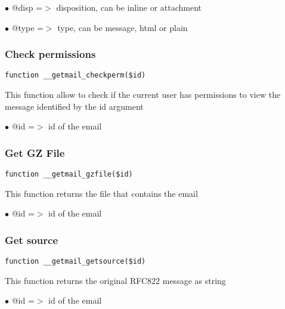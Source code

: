 \documentclass[a4paper]{article}
\begin{document}
\begin{compactitem}
\item[\color{myblue}$\bullet$] @disp =$>$ disposition, can be inline or attachment
\item[\color{myblue}$\bullet$] @type =$>$ type, can be message, html or plain
\end{compactitem}

\hypertarget{toc89}{}
\subsubsection{Check permissions}

\begin{lstlisting}
function __getmail_checkperm($id)
\end{lstlisting}

This function allow to check if the current user has permissions to view the
message identified by the id argument

\begin{compactitem}
\item[\color{myblue}$\bullet$] @id =$>$ id of the email
\end{compactitem}

\hypertarget{toc90}{}
\subsubsection{Get GZ File}

\begin{lstlisting}
function __getmail_gzfile($id)
\end{lstlisting}

This function returns the file that contains the email

\begin{compactitem}
\item[\color{myblue}$\bullet$] @id =$>$ id of the email
\end{compactitem}

\hypertarget{toc91}{}
\subsubsection{Get source}

\begin{lstlisting}
function __getmail_getsource($id)
\end{lstlisting}

This function returns the original RFC822 message as string

\begin{compactitem}
\item[\color{myblue}$\bullet$] @id =$>$ id of the email
\end{compactitem}
\end{document}
